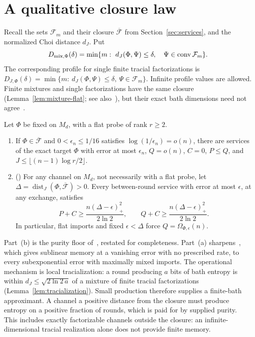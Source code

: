\section{A qualitative closure law}\label{sec:closure}

Recall the sets $\mathcal F_m$ and their closure $\overline{\mathcal F}$ from Section~\ref{sec:services}, and the normalized Choi
distance $d_J$. Put
\[
D_{\rm mix,\Phi}(\delta)=\min\{m:\ d_J(\Phi,\Psi)\le\delta,\quad\Psi\in\operatorname{conv}\mathcal F_m\}.
\]
The corresponding profile for single finite tracial factorizations is
$D_{J,\Phi}(\delta)=\min\{m:\ d_J(\Phi,\Psi)\le\delta,\ \Psi\in\mathcal F_m\}$. Infinite profile values are allowed.
Finite mixtures and single factorizations have the same closure (Lemma~\ref{lem:mixture-flat}; see also~\cite[Proposition~3.8(ii)]{Musat2025}),
but their exact bath dimensions need not agree~\cite[Propositions~3.6 and~3.8(i)]{Musat2025}.

\begin{theorem}\label{thm:closure-law}
Let $\Phi$ be fixed on $M_d$, with a flat probe of rank $r\ge2$.
\begin{enumerate}[label=(\alph*),itemsep=1pt]
\item If $\Phi\in\overline{\mathcal F}$ and $0<\epsilon_n\le1/16$ satisfies $\log(1/\epsilon_n)=o(n)$, there are services of the exact
target $\Phi$ with error at most $\epsilon_n$, $Q=o(n)$, $C=0$, $P\le Q$, and $J\le\lfloor(n-1)\log r/2\rfloor$.
\item (\cite[Theorem~3.2(b)]{DouglasMghirbiB}) For any channel on $M_d$, not necessarily with a flat probe, let
$\Delta=\operatorname{dist}_J(\Phi,\overline{\mathcal F})>0$. Every between-round service with error at most $\epsilon$, at any exchange, satisfies
\[
 P+C\ge\frac{n(\Delta-\epsilon)_+^2}{2\ln2},\qquad
 Q+C\ge\frac{n(\Delta-\epsilon)_+^2}{2\ln2}.
\]
In particular, flat imports and fixed $\epsilon<\Delta$ force $Q=\Omega_{\Phi,\epsilon}(n)$.
\end{enumerate}
\end{theorem}

Part~(b) is the purity floor of~\cite[Theorem~3.2(b)]{DouglasMghirbiB},
restated for completeness. Part~(a) sharpens~\cite[Corollary~3.3(c)]{DouglasMghirbiB},
which gives sublinear memory at a vanishing error with no prescribed rate, to every subexponential error with
maximally mixed imports.
The operational mechanism is local tracialization:
a round producing $a$ bits of bath entropy is within
$d_J\leq\sqrt{2\ln2\,a}$ of a mixture of finite tracial factorizations
(Lemma~\ref{lem:tracialization}). Small production therefore supplies
a finite-bath approximant. A channel a positive distance from the
closure must produce entropy on a positive fraction of rounds,
which is paid for by supplied purity. This includes exactly
factorizable channels outside the closure: an infinite-dimensional
tracial realization alone does not provide finite memory.

